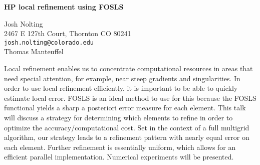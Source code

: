 \documentclass{report}
\begin{document}

\begin{center}
{\large
{\bf HP local refinement using FOSLS}}

	Josh Nolting \\
	2467 E 127th Court,  Thornton CO 80241 \\
	{\tt josh.nolting@colorado.edu} \\
	Thomas Manteuffel
\end{center}
Local refinement enables us to concentrate computational
resources in areas that need special attention, for example,
near steep gradients and singularities. In order to use
local refinement efficiently, it is important to be able to
quickly estimate local error. FOSLS is an ideal method to
use for this because the FOSLS functional yields a sharp a
posteriori error measure for each element. This talk will
discuss a strategy for determining which elements to refine
in order to optimize the accuracy/computational cost. Set in
the context of a full multigrid algorithm, our strategy
leads to a refinement pattern with nearly equal error on
each element. Further refinement is essentially uniform,
which allows for an efficient parallel implementation.
Numerical experiments will be presented.



\end{document}
